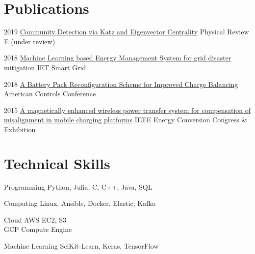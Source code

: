 \documentclass{tccv}
\begin{document}
\section{Publications}
\begin{yearlist}
	\item{2019}
	{\href{htts://arxiv.org}{Community Detection via Katz and Eigenvector Centrality}}
	{Physical Review E (under review)}
	
	\item{2018}
	{\href{https://digital-library.theiet.org/content/journals/10.1049/iet-stg.2018.0043}{Machine Learning based Energy Management System for grid disaster mitigation}}
	{IET Smart Grid}
	
	\item{2018}
	{\href{https://ieeexplore.ieee.org/document/8431612}{A Battery Pack Reconfiguration Scheme for Improved Charge Balancing}}
	{American Controls Conference}
	
	\item{2015}
	{\href{http://ieeexplore.ieee.org/document/7309840/}{A magnetically enhanced wireless power transfer system for compensation of misalignment in mobile charging platforms}}
	{IEEE Energy Conversion Congress \& Exhibition}
	
\end{yearlist}

\section{Technical Skills}

\begin{factlist}

\item{Programming}
    {Python, Julia, C, C++, Java, SQL}
    
\item{Computing}
     {Linux, Ansible, Docker, Elastic, Kafka}
     
\item{Cloud}
    {AWS EC2, S3\\
    GCP Compute Engine}

\item{Machine Learning}
     {SciKit-Learn, Keras, TensorFlow}


\end{factlist}
\end{document}
